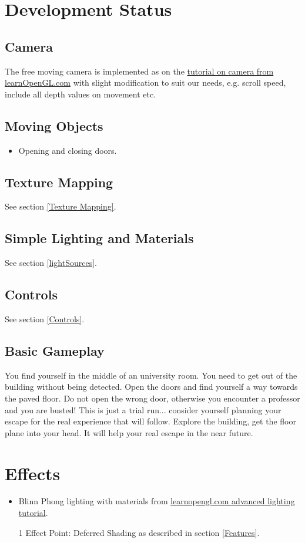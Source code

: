 \documentclass[12pt]{article}
\begin{document}
\section{Development Status}
\subsection{Camera}
The free moving camera is implemented as on the \href{http://www.learnopengl.com/#!Getting-started/Camera}{tutorial on camera from learnOpenGL.com} with slight modification to suit our needs, e.g. scroll speed, include all depth values on movement etc.

\subsection{Moving Objects}
\begin{itemize}
\item Opening and closing doors.
\end{itemize}

\subsection{Texture Mapping}
See section \ref{Texture Mapping}.
\subsection{Simple Lighting and Materials}
See section \ref{lightSources}.
\subsection{Controls}
See section \ref{Controls}.
\subsection{Basic Gameplay}
You find yourself in the middle of an university room. You need to get out of the building without being detected. Open the doors and find yourself a way towards the paved floor. Do not open the wrong door, otherwise you encounter a professor and you are busted!
This is just a trial run... consider yourself planning your escape for the real experience that will follow. Explore the building, get the floor plane into your head. It will help your real escape in the near future.


\section{Effects}
\begin{itemize}
	\item Blinn Phong lighting with materials from \href{http://learnopengl.com/#!Advanced-Lighting/Advanced-Lighting}{learnopengl.com advanced lighting tutorial}.
	\item [1] Effect Point: Deferred Shading as described in section \ref{Features}.
\end{itemize}
\end{document}
